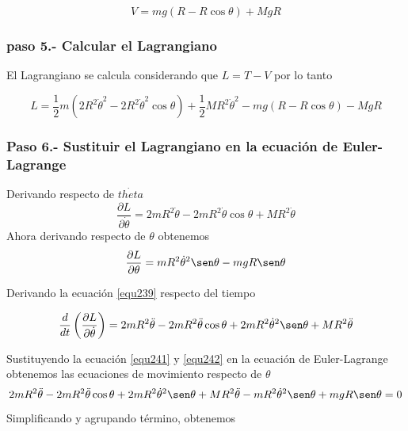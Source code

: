 \documentclass[12pt]{book}
\theoremstyle{definition}
\theoremstyle{remark}
\theoremstyle{plain}
\begin{document}
\begin{equation}
\label{equ237}
V = m g (R- R \cos \theta)+ M g R
\end{equation}

\subsubsection{paso 5.- Calcular el Lagrangiano}

El Lagrangiano se calcula considerando que $L=T-V$ por lo tanto

\begin{equation}
\label{equ238}
L =  \frac{1}{2} m (2  R^2 \dot{\theta}^2- 2 R^2 \dot{\theta}^2 \cos \theta )+\frac{1}{2} M R ^2 \dot{\theta}^2 - m g (R- R \cos \theta) -  M g R
\end{equation}

\subsubsection{Paso 6.- Sustituir el Lagrangiano en la ecuación de Euler-Lagrange}

Derivando respecto de $\dot{theta}$
\begin{equation}
\label{equ239}
\frac{\partial L}{\partial \dot{\theta}}= 2 m R^2 \dot{\theta}-2 m R^2 \dot{\theta} \cos \theta+ M R^2 \dot{\theta} 
\end{equation}
Ahora derivando respecto de $\theta$ obtenemos
\begin{equation}
\label{equ240}
\frac{\partial L}{\partial \theta}= m R^2 \dot{\theta}^2 \sen \theta- m g R \sen \theta 
\end{equation}


Derivando la ecuación \ref{equ239} respecto del tiempo

\begin{equation}
\label{equ241}
\frac{d}{d t} \left ( \frac{\partial L}{\partial \dot{\theta}}\right )= 2 m R^2 \ddot{\theta}-2 m R^2 \ddot{\theta} \cos \theta+2 m R^2 \dot{\theta}^2 \sen \theta+ M R^2 \ddot{\theta} 
\end{equation}
 
Sustituyendo la ecuación \ref{equ241} y \ref{equ242} en la ecuación de Euler-Lagrange obtenemos las ecuaciones de movimiento respecto de $\theta$
\begin{equation*}
2 m R^2 \ddot{\theta}-2 m R^2 \ddot{\theta} \cos \theta+2 m R^2 \dot{\theta}^2 \sen \theta+ M R^2 \ddot{\theta}-m R^2 \dot{\theta}^2 \sen \theta+ m g R \sen \theta =0
\end{equation*}
Simplificando y agrupando término,  obtenemos
\end{document}
